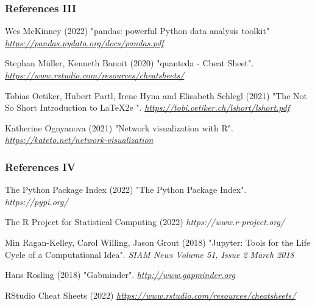 \documentclass{beamer}
\begin{document}
\begin{frame}
\frametitle{References III}
\footnotesize{
\begin{thebibliography}{99} 


 Wes McKinney (2022)
\newblock "pandas: powerful Python data analysis toolkit"
\newblock \emph{\url{https://pandas.pydata.org/docs/pandas.pdf }}

 Stephan M\"{u}ller, Kenneth Banoit (2020)
\newblock "quanteda - Cheat Sheet".
\newblock \emph{\url{https://www.rstudio.com/resources/cheatsheets/}}

 Tobias Oetiker, Hubert Partl, Irene Hyna and Elisabeth Schlegl (2021)
\newblock "The Not So Short Introduction to \LaTeX2e ".
\newblock \emph{\url{https://tobi.oetiker.ch/lshort/lshort.pdf}}

 Katherine Ognyanova (2021)
\newblock "Network visualization with R".
\newblock \emph{\url{https://kateto.net/network-visualization}}
\end{thebibliography}
}
\end{frame}








\begin{frame}
\frametitle{References IV}
\footnotesize{
\begin{thebibliography}{99} 
 The Python Package Index (2022)
\newblock "The Python Package Index".
\newblock \emph{https://pypi.org/}

 The R Project for Statistical Computing (2022)
\newblock \emph{https://www.r-project.org/}

 Min Ragan-Kelley, Carol Willing, Jason Grout (2018)
\newblock "Jupyter: Tools for the Life Cycle of a Computational Idea".
\newblock \emph{SIAM News Volume 51, Issue 2 March 2018}

 Hans Rosling (2018)
\newblock "Gabminder".
\newblock \emph{\url{http://www.gapminder.org}}

 RStudio Cheat Sheets (2022)
\newblock \emph{\url{https://www.rstudio.com/resources/cheatsheets/}}

\end{thebibliography}
}
\end{frame}
\end{document}

